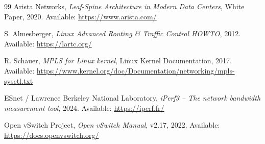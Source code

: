 \begin{thebibliography}{99}
Arista Networks,
\textit{Leaf-Spine Architecture in Modern Data Centers},
White Paper, 2020.
Available: \url{https://www.arista.com/}

S. Almesberger,
\textit{Linux Advanced Routing \& Traffic Control HOWTO},
2012.
Available: \url{https://lartc.org/}

R. Schauer,
\textit{MPLS for Linux kernel},
Linux Kernel Documentation, 2017.
Available: \url{https://www.kernel.org/doc/Documentation/networking/mpls-sysctl.txt}

ESnet / Lawrence Berkeley National Laboratory,
\textit{iPerf3 -- The network bandwidth measurement tool},
2024.
Available: \url{https://iperf.fr/}

Open vSwitch Project,
\textit{Open vSwitch Manual}, v2.17, 2022.
Available: \url{https://docs.openvswitch.org/}

\end{thebibliography}